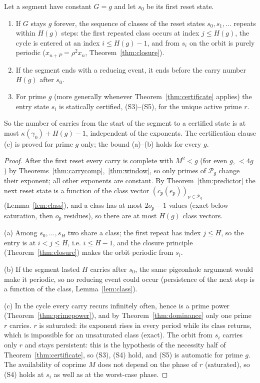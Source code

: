 \begin{theorem}\label{thm:entry}
Let a segment have constant \(G=g\) and let \(s_0\) be its first reset state.
\begin{enumerate}[label=(\alph*),nosep]
\item If \(G\) stays \(g\) forever, the sequence of classes of the reset states \(s_0,s_1,\dots\) repeats within \(H(g)\) steps: the first repeated class occurs at index \(j\le H(g)\), the cycle is entered at an index \(i\le H(g)-1\), and from \(s_i\) on the orbit is purely periodic (\(x_{n+P}=\rho^2x_n\), Theorem~\ref{thm:closure}).
\item If the segment ends with a reducing event, it ends before the carry number \(H(g)\) after \(s_0\).
\item For prime \(g\) (more generally whenever Theorem~\ref{thm:certificate} applies) the entry state \(s_i\) is statically certified, (S3)--(S5), for the unique active prime \(r\).
\end{enumerate}
So the number of carries from the start of the segment to a certified state is at most \(\kappa(\gamma_0)+H(g)-1\), independent of the exponents. The certification clause (c) is proved for prime \(g\) only; the bound (a)--(b) holds for every \(g\).
\end{theorem}
\begin{proof}
After the first reset every carry is complete with \(M^2<g\) (for even \(g\), \(<4g\)) by Theorems~\ref{thm:carrycomp},~\ref{thm:window}, so only primes of \(\mathcal P_g\) change their exponent; all other exponents are constant. By Theorem~\ref{thm:predictor} the next reset state is a function of the class vector \((c_p(e_p))_{p\in\mathcal P_g}\) (Lemma~\ref{lem:class}), and a class has at most \(2o_p-1\) values (exact below saturation, then \(o_p\) residues), so there are at most \(H(g)\) class vectors.

(a) Among \(s_0,\dots,s_H\) two share a class; the first repeat has index \(j\le H\), so the entry is at \(i<j\le H\), i.e. \(i\le H-1\), and the closure principle (Theorem~\ref{thm:closure}) makes the orbit periodic from \(s_i\).

(b) If the segment lasted \(H\) carries after \(s_0\), the same pigeonhole argument would make it periodic, so no reducing event could occur (persistence of the next step is a function of the class, Lemma~\ref{lem:class}).

(c) In the cycle every carry recurs infinitely often, hence is a prime power (Theorem~\ref{thm:primepower}), and by Theorem~\ref{thm:dominance} only one prime \(r\) carries. \(r\) is saturated: its exponent rises in every period while its class returns, which is impossible for an unsaturated class (exact). The orbit from \(s_i\) carries only \(r\) and stays persistent: this is the hypothesis of the necessity half of Theorem~\ref{thm:certificate}, so (S3), (S4) hold, and (S5) is automatic for prime \(g\). The availability of coprime \(M\) does not depend on the phase of \(r\) (saturated), so (S4) holds at \(s_i\) as well as at the worst-case phase.
\end{proof}

